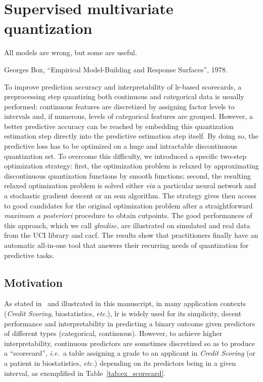 \chapter{Supervised multivariate quantization} \label{chap4}


\epigraph{All models are wrong, but some are useful.}{Georges Box, ``Empirical Model-Building and Response Surfaces'', 1978.}

\minitoc


\bigskip

To improve prediction accuracy and interpretability of \gls{lr}-based scorecards, a preprocessing step quantizing both continuous and categorical data is usually performed: continuous features are discretized by assigning factor levels to intervals and, if numerous, levels of categorical features are grouped. However, a better predictive accuracy can be reached by embedding this quantization estimation step directly into the predictive estimation step itself. By doing so, the predictive loss has to be optimized on a huge and intractable discontinuous quantization set. To overcome this difficulty, we introduced a specific two-step optimization strategy: first, the optimization problem is relaxed by approximating discontinuous quantization functions by smooth functions; second, the resulting relaxed optimization problem is solved either \textit{via} a particular neural network and a stochastic gradient descent or an \gls{sem} algorithm. The strategy gives then access to good candidates for the original optimization problem after a straightforward \textit{maximum a posteriori} procedure to obtain cutpoints. The good performances of this approach, which we call \textit{glmdisc}, are illustrated on simulated and real data from the UCI library and \gls{cacf}. The results show that practitioners finally have an automatic all-in-one tool that answers their recurring needs of quantization for predictive tasks.
 
\section{Motivation} \label{sec:motivation}

As stated in~\cite{hosmer2013applied} and illustrated in this manuscript, in many application contexts (\textit{Credit Scoring}, biostatistics, {\it etc.}), \gls{lr} is widely used for its simplicity, decent performance and interpretability in predicting a binary outcome given predictors of different types (categorical, continuous). However, to achieve  higher interpretability, continuous predictors are sometimes discretized so as to produce a ``scorecard'', \textit{i.e.}\ a table assigning a grade to an applicant in \textit{Credit Scoring} (or a patient in biostatistics, {\it etc.}) depending on its predictors being in a given interval, as exemplified in Table~\ref{tab:ex_scorecard}.

